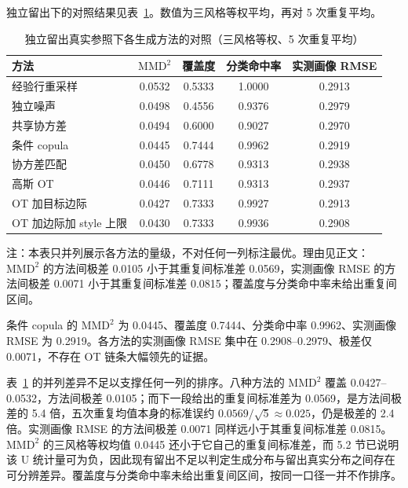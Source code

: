 \documentclass[UTF8,a4paper,zihao=-4]{ctexart}
\numberwithin{figure}{section}
\numberwithin{table}{section}
\numberwithin{equation}{section}
\begin{document}
独立留出下的对照结果见表~\ref{tab:q3-res}。数值为三风格等权平均，再对 5 次重复平均。

\begin{table}[H]
  \centering
  \caption{独立留出真实参照下各生成方法的对照（三风格等权、5 次重复平均）}
  \label{tab:q3-res}
  \small
  \begin{tabularx}{\textwidth}{@{}>{\raggedright\arraybackslash}X c c c c@{}}
    \toprule
    方法 & $\mathrm{MMD}^{2}$ & 覆盖度 & 分类命中率 & 实测画像 RMSE \\
    \midrule
    经验行重采样 & 0.0532 & 0.5333 & 1.0000 & 0.2913 \\
    独立噪声 & 0.0498 & 0.4556 & 0.9376 & 0.2979 \\
    共享协方差 & 0.0494 & 0.6000 & 0.9027 & 0.2970 \\
    条件 copula & 0.0445 & 0.7444 & 0.9962 & 0.2919 \\
    协方差匹配 & 0.0450 & 0.6778 & 0.9313 & 0.2938 \\
    高斯 OT & 0.0446 & 0.7111 & 0.9313 & 0.2937 \\
    OT 加目标边际 & 0.0427 & 0.7333 & 0.9927 & 0.2913 \\
    OT 加边际加 style 上限 & 0.0430 & 0.7333 & 0.9936 & 0.2908 \\
    \bottomrule
  \end{tabularx}
  \par\vspace{3pt}
  \begin{minipage}{\textwidth}
    \footnotesize 注：本表只并列展示各方法的量级，不对任何一列标注最优。理由见正文：$\mathrm{MMD}^{2}$ 的方法间极差 0.0105 小于其重复间标准差 0.0569，实测画像 RMSE 的方法间极差 0.0071 小于其重复间标准差 0.0815；覆盖度与分类命中率未给出重复间区间。
  \end{minipage}
\end{table}

条件 copula 的 $\mathrm{MMD}^{2}$ 为 0.0445、覆盖度 0.7444、分类命中率 0.9962、实测画像 RMSE 为 0.2919。各方法的实测画像 RMSE 集中在 0.2908--0.2979、极差仅 0.0071，不存在 OT 链条大幅领先的证据。

表~\ref{tab:q3-res} 的并列差异不足以支撑任何一列的排序。八种方法的 $\mathrm{MMD}^{2}$ 覆盖 0.0427--0.0532，方法间极差 0.0105；而下一段给出的重复间标准差为 0.0569，是方法间极差的 5.4 倍，五次重复均值本身的标准误约 $0.0569/\sqrt{5}\approx0.025$，仍是极差的 2.4 倍。实测画像 RMSE 的方法间极差 0.0071 同样远小于其重复间标准差 0.0815。$\mathrm{MMD}^{2}$ 的三风格等权均值 0.0445 还小于它自己的重复间标准差，而 5.2 节已说明该 U 统计量可为负，因此现有留出不足以判定生成分布与留出真实分布之间存在可分辨差异。覆盖度与分类命中率未给出重复间区间，按同一口径一并不作排序。
\end{document}
